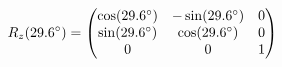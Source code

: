 \documentclass[preview]{standalone}
\begin{document}
\begin{align*}
\special{dvisvgm:raw <g id='unique000'>}R_z(29.6^\circ) = \begin{pmatrix} \cos(29.6^\circ) & -\sin(29.6^\circ) & 0 \\ \sin(29.6^\circ) & \cos(29.6^\circ) & 0 \\ 0 & 0 & 1 \end{pmatrix}\special{dvisvgm:raw </g>}
\end{align*}
\end{document}
